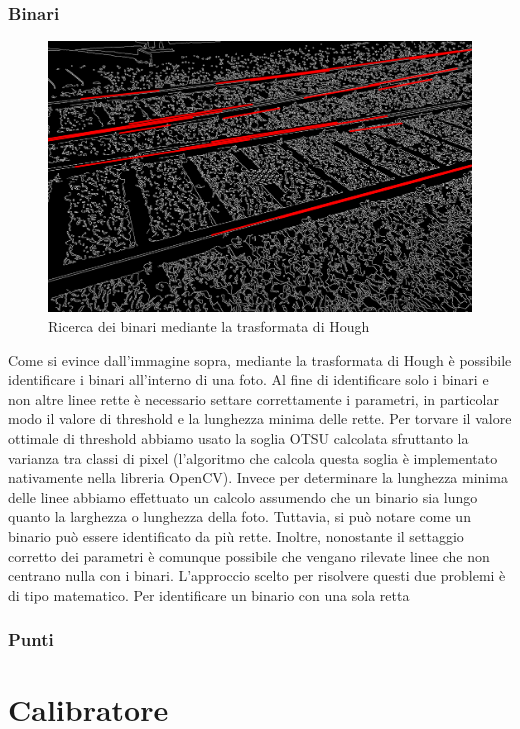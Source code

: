 \documentclass[twoside]{supsistudent}
\begin{document}
\subsubsection{Binari}
\begin{figure}[H]
  \center
  \includegraphics[scale=0.25]{images/houghLines.png}
  \caption{Ricerca dei binari mediante la trasformata di Hough}
\end{figure}
Come si evince dall'immagine sopra, mediante la trasformata di Hough è possibile identificare 
i binari all'interno di una foto. Al fine di identificare solo i binari e non altre linee rette
è necessario settare correttamente i parametri, in particolar modo il valore di threshold e 
la lunghezza minima delle rette. Per torvare il valore ottimale di threshold abbiamo usato la soglia OTSU 
calcolata sfruttanto la varianza tra classi di pixel (l'algoritmo che calcola questa soglia è implementato nativamente
nella libreria OpenCV). Invece per determinare la lunghezza minima delle linee abbiamo effettuato un calcolo 
assumendo che un binario sia lungo quanto la larghezza o lunghezza della foto. Tuttavia, si può notare
come un binario può essere identificato da più rette. Inoltre, nonostante il settaggio corretto dei parametri 
è comunque possibile che vengano rilevate linee che non centrano nulla con i binari. L'approccio scelto
per risolvere questi due problemi è di tipo matematico. Per identificare un binario con una sola retta 
\subsubsection{Punti}
\section{Calibratore}
\end{document}
